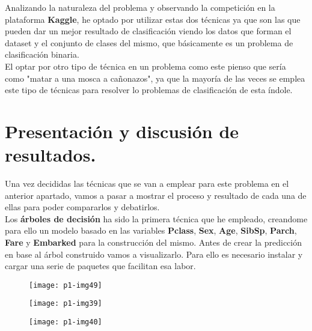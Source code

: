\documentclass[10pt]{article}
\begin{document}
Analizando la naturaleza del problema y observando la competición en la plataforma \textbf{Kaggle}, he optado por utilizar estas dos técnicas ya que son las que pueden dar un mejor resultado de clasificación viendo los datos que forman el dataset y el conjunto de clases del mismo, que básicamente es un problema de clasificación binaria.\\ 

El optar por otro tipo de técnica en un problema como este pienso que sería como "matar a una mosca a cañonazos", ya que la mayoría de las veces se emplea este tipo de técnicas para resolver lo problemas de clasificación de esta índole.\\


\section{Presentación y discusión de resultados.} 

Una vez decididas las técnicas que se van a emplear para este problema en el anterior apartado, vamos a pasar a mostrar el proceso y resultado de cada una de ellas para poder compararlos y debatirlos. \\ 

Los \textbf{árboles de decisión} ha sido la primera técnica que he empleado, creandome para ello un modelo basado en las variables \textbf{Pclass}, \textbf{Sex}, \textbf{Age}, \textbf{SibSp}, \textbf{Parch}, \textbf{Fare} y \textbf{Embarked} para la construcción del mismo. Antes de crear la predicción en base al árbol construido vamos a visualizarlo. Para ello es necesario instalar y cargar una serie de paquetes que facilitan esa labor. \\

\begin{figure}[H]
	\begin{center}
 		\texttt{[image: p1-img49]}
	\end{center} 
\end{figure}  

\begin{figure}[H]
	\begin{center}
 		\texttt{[image: p1-img39]}
	\end{center} 
\end{figure}  

\begin{figure}[H]
	\begin{center}
 		\texttt{[image: p1-img40]}
	\end{center} 
\end{figure} 
 
\end{document}
